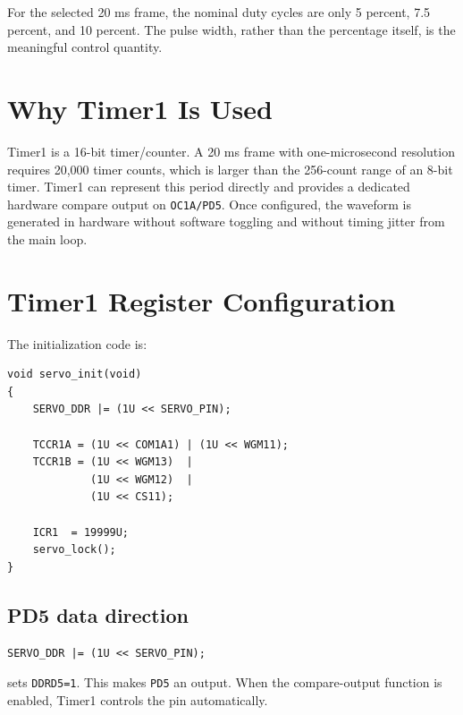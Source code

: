 \documentclass[11pt,a4paper]{article}
\begin{document}
For the selected 20 ms frame, the nominal duty cycles are only 5 percent, 7.5 percent, and 10 percent. The pulse width, rather than the percentage itself, is the meaningful control quantity.

\section{Why Timer1 Is Used}
Timer1 is a 16-bit timer/counter. A 20 ms frame with one-microsecond resolution requires 20,000 timer counts, which is larger than the 256-count range of an 8-bit timer. Timer1 can represent this period directly and provides a dedicated hardware compare output on \texttt{OC1A/PD5}. Once configured, the waveform is generated in hardware without software toggling and without timing jitter from the main loop.

\section{Timer1 Register Configuration}
The initialization code is:
\begin{lstlisting}[style=cstyle,caption={Servo initialization and Timer1 configuration.}]
void servo_init(void)
{
    SERVO_DDR |= (1U << SERVO_PIN);

    TCCR1A = (1U << COM1A1) | (1U << WGM11);
    TCCR1B = (1U << WGM13)  |
             (1U << WGM12)  |
             (1U << CS11);

    ICR1  = 19999U;
    servo_lock();
}
\end{lstlisting}

\subsection{PD5 data direction}
\begin{lstlisting}[style=cstyle]
SERVO_DDR |= (1U << SERVO_PIN);
\end{lstlisting}
sets \texttt{DDRD5=1}. This makes \texttt{PD5} an output. When the compare-output function is enabled, Timer1 controls the pin automatically.
\end{document}
